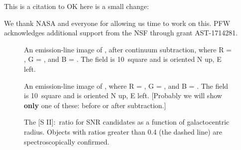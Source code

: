This is a citation to \cite{long14}   OK here is a small change:

\acknowledgments

We thank NASA and everyone for allowing us time to work on this.  PFW acknowledges additional support from the NSF through grant AST-1714281.

\pagebreak





\clearpage





\startlongtable

\clearpage





\pagebreak

\startlongtable



\pagebreak
%

\begin{figure}
\caption{An emission-line image of \gal, after continuum subtraction, where R = \ha, G = \sii, and B = \oiii.  The field is 10\arcmin\ square and is oriented N up, E left. \label{fig_overview} }
\end{figure}

\begin{figure}
\caption{An emission-line image of \gal, where R = \ha, G = \sii, and B = \oiii.  The field is 10\arcmin\ square and is oriented N up, E left.  [Probably we will show {\bf only} one of these: before or after subtraction.] }
\end{figure}

\begin{figure}
\caption{The [S II]:\ha\ ratio for SNR candidates as a function of galactocentric radius.  Objects with ratios greater than 0.4 (the dashed line) are spectroscopically confirmed. \label{fig_s2_ha}}

\end{figure}

